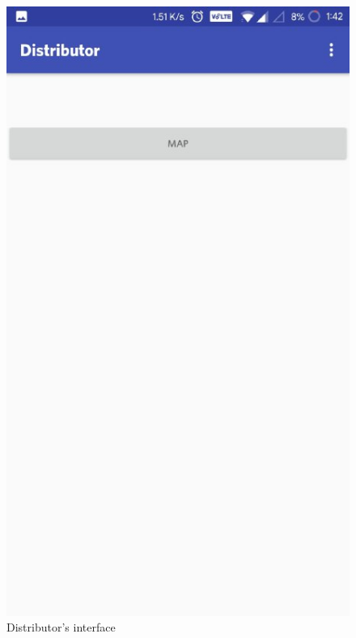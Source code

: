\begin{figure}[h]
  \begin{center}
\includegraphics[scale=0.6]{3/ten.jpeg}
\caption{Distributor's interface}
\label{fig:two}
\end{center}
\end{figure}


